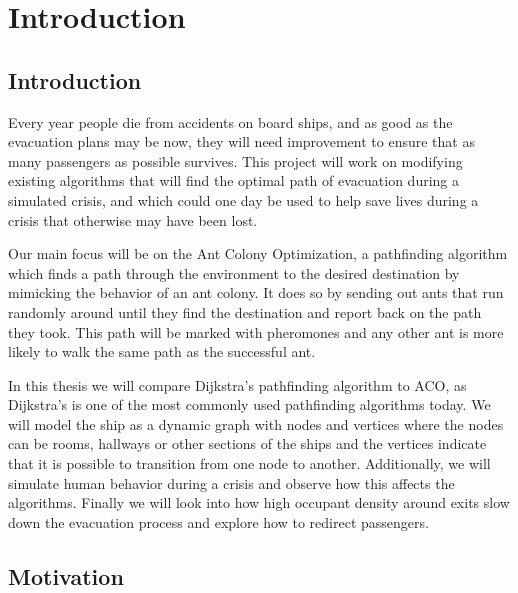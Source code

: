 \chapter{Introduction}
\label{ch:introduction}

\section{Introduction}

Every year people die from accidents on board ships, and as good as the evacuation plans may be now,                           %
they will need improvement to ensure that as many passengers as possible survives. This project will work                            %
 on modifying existing algorithms that will find the optimal path of evacuation during a simulated crisis, and which could         %
 one day be used to help save lives during a crisis that otherwise may have been lost. 

Our main focus will be on the Ant Colony Optimization, a pathfinding algorithm which finds a path through
 the environment to the desired destination by mimicking the behavior of an ant colony. It does so by sending    %
out ants that run randomly around until they find the destination and report back on the path they took.             %
 This path will be marked with pheromones and any other ant is more likely to walk the same path as the successful ant. 

In this thesis we will compare Dijkstra's pathfinding algorithm to ACO, as Dijkstra's is one of the most commonly
 used pathfinding algorithms today. We will model the ship as a dynamic graph with nodes and vertices where
 the nodes can be rooms, hallways or other sections of the ships and the vertices indicate that it is possible to
 transition from one node to another. Additionally, we will simulate human behavior during a crisis and observe
 how this affects the algorithms. Finally we will look into how high occupant density around exits slow down the 
evacuation process and explore how to redirect passengers.

\section{Motivation}

